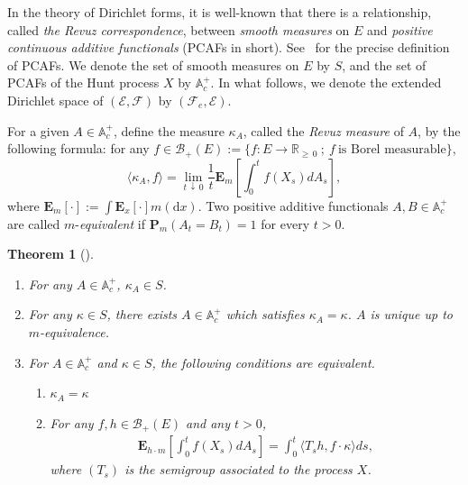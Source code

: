 \documentclass[10pt]{amsart}
\newtheorem{theo}{Theorem}[section]
\theoremstyle{definition}\newtheorem{defi}[theo]{Definition}\newtheorem{rema}[theo]{Remark}\newtheorem{exam}[theo]{Example}\newtheorem{exem}[theo]{Example}\newtheorem{nota}[theo]{Notation}
\newcommand{\ce}{\mathcal{E}}
\newcommand{\cf}{\mathcal{F}}
\newcommand{\cb}{\mathcal{B}}
\newcommand{\ba}{\mathbb{A}}
\newcommand{\br}{\mathbb{R}}
\newcommand{\bfE}{\mathbf{E}}
\newcommand{\bfP}{\mathbf{P}}
\newcommand{\rmd}{\mathrm{d}}
\newcommand*{\alphenumi}{\renewcommand*{\theenumi}{\alph{enumi}}}
\begin{document}
In the theory of Dirichlet forms, it is well-known that there is a relationship, called \emph{the Revuz correspondence}, between \emph{smooth measures} on $E$ and \emph{positive continuous additive functionals} (PCAFs in short). See~\cite{CF,FOT} for the precise definition of PCAFs. We denote the set of smooth measures on $E$ by $S$, and the set of PCAFs of the Hunt process $X$ by $\ba_c^{+}$. In what follows, we denote the extended Dirichlet space of $(\ce,\cf)$ by $(\cf_e,\ce)$.

For a given $A\in\ba_c^{+}$, define the measure $\kappa_A$, called the \emph{Revuz measure} of $A$, by the following formula: for any $f\in\cb_+(E):=\{f:E\to\br_{\geq\,0}\ ;\ f\ \text{is\ Borel\ measurable}\}$,
\[
\langle\kappa_A,f\rangle=\lim_{t\,\downarrow\,0}\frac{1}{t}\bfE_m\left[\int_0^tf(X_s)dA_s\right],
\]
where $\bfE_m[\cdot]:=\int \bfE_x[\cdot]m(\rmd x)$. Two positive additive functionals $A,B\in\ba_c^+$ are called $m$-\emph{equivalent} if $\bfP_m(A_t=B_t)=1$ for every $t>0$.

\begin{theo}[{\cite[Theorem~5.1.3]{FOT}\cite[Theorem~4.1.1]{CF}}]\label{7.1}\leavevmode
\begin{enumerate}
\item For any $A\in\ba_c^+$, $\kappa_A\in S$.
\item For any $\kappa\in S$, there exists $A\in\ba_c^+$ which satisfies $\kappa_A=\kappa$. $A$ is unique up to $m$-equivalence.
\item For $A\in\ba_c^+$ and $\kappa\in S$, the following conditions are equivalent.
\begin{enumerate}\alphenumi
\item $\kappa_A=\kappa$
\item For any $f,h\in\cb_+(E)$ and any $t>0$,
\begin{align}\label{revuz-corr}
\bfE_{h\cdot m}\left[\int_0^{t}f(X_s)dA_s\right]=\int_0^t\langle T_{s}h,f\cdot\kappa\rangle ds,
\end{align}
where $(T_s)$ is the semigroup associated to the process $X$.
\end{enumerate}
\end{enumerate}
\end{theo}
\end{document}
